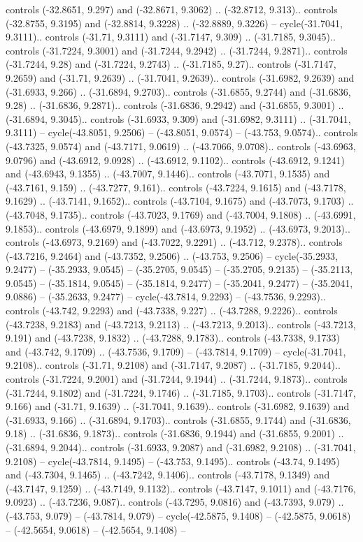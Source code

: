 \begin{scope}[shift={(2.5552, 9.9912)}]
\begin{scope}[shift={(48.1654, -14.8546)}]
controls (-32.8651, 9.297) and (-32.8671, 9.3062) .. (-32.8712, 9.313).. controls (-32.8755, 9.3195) and (-32.8814, 9.3228) .. (-32.8889, 9.3226) -- cycle(-31.7041, 9.3111).. controls (-31.71, 9.3111) and (-31.7147, 9.309) .. (-31.7185, 9.3045).. controls (-31.7224, 9.3001) and (-31.7244, 9.2942) .. (-31.7244, 9.2871).. controls (-31.7244, 9.28) and (-31.7224, 9.2743) .. (-31.7185, 9.27).. controls (-31.7147, 9.2659) and (-31.71, 9.2639) .. (-31.7041, 9.2639).. controls (-31.6982, 9.2639) and (-31.6933, 9.266) .. (-31.6894, 9.2703).. controls (-31.6855, 9.2744) and (-31.6836, 9.28) .. (-31.6836, 9.2871).. controls (-31.6836, 9.2942) and (-31.6855, 9.3001) .. (-31.6894, 9.3045).. controls (-31.6933, 9.309) and (-31.6982, 9.3111) .. (-31.7041, 9.3111) -- cycle(-43.8051, 9.2506) -- (-43.8051, 9.0574) -- (-43.753, 9.0574).. controls (-43.7325, 9.0574) and (-43.7171, 9.0619) .. (-43.7066, 9.0708).. controls (-43.6963, 9.0796) and (-43.6912, 9.0928) .. (-43.6912, 9.1102).. controls (-43.6912, 9.1241) and (-43.6943, 9.1355) .. (-43.7007, 9.1446).. controls (-43.7071, 9.1535) and (-43.7161, 9.159) .. (-43.7277, 9.161).. controls (-43.7224, 9.1615) and (-43.7178, 9.1629) .. (-43.7141, 9.1652).. controls (-43.7104, 9.1675) and (-43.7073, 9.1703) .. (-43.7048, 9.1735).. controls (-43.7023, 9.1769) and (-43.7004, 9.1808) .. (-43.6991, 9.1853).. controls (-43.6979, 9.1899) and (-43.6973, 9.1952) .. (-43.6973, 9.2013).. controls (-43.6973, 9.2169) and (-43.7022, 9.2291) .. (-43.712, 9.2378).. controls (-43.7216, 9.2464) and (-43.7352, 9.2506) .. (-43.753, 9.2506) -- cycle(-35.2933, 9.2477) -- (-35.2933, 9.0545) -- (-35.2705, 9.0545) -- (-35.2705, 9.2135) -- (-35.2113, 9.0545) -- (-35.1814, 9.0545) -- (-35.1814, 9.2477) -- (-35.2041, 9.2477) -- (-35.2041, 9.0886) -- (-35.2633, 9.2477) -- cycle(-43.7814, 9.2293) -- (-43.7536, 9.2293).. controls (-43.742, 9.2293) and (-43.7338, 9.227) .. (-43.7288, 9.2226).. controls (-43.7238, 9.2183) and (-43.7213, 9.2113) .. (-43.7213, 9.2013).. controls (-43.7213, 9.191) and (-43.7238, 9.1832) .. (-43.7288, 9.1783).. controls (-43.7338, 9.1733) and (-43.742, 9.1709) .. (-43.7536, 9.1709) -- (-43.7814, 9.1709) -- cycle(-31.7041, 9.2108).. controls (-31.71, 9.2108) and (-31.7147, 9.2087) .. (-31.7185, 9.2044).. controls (-31.7224, 9.2001) and (-31.7244, 9.1944) .. (-31.7244, 9.1873).. controls (-31.7244, 9.1802) and (-31.7224, 9.1746) .. (-31.7185, 9.1703).. controls (-31.7147, 9.166) and (-31.71, 9.1639) .. (-31.7041, 9.1639).. controls (-31.6982, 9.1639) and (-31.6933, 9.166) .. (-31.6894, 9.1703).. controls (-31.6855, 9.1744) and (-31.6836, 9.18) .. (-31.6836, 9.1873).. controls (-31.6836, 9.1944) and (-31.6855, 9.2001) .. (-31.6894, 9.2044).. controls (-31.6933, 9.2087) and (-31.6982, 9.2108) .. (-31.7041, 9.2108) -- cycle(-43.7814, 9.1495) -- (-43.753, 9.1495).. controls (-43.74, 9.1495) and (-43.7304, 9.1465) .. (-43.7242, 9.1406).. controls (-43.7178, 9.1349) and (-43.7147, 9.1259) .. (-43.7149, 9.1132).. controls (-43.7147, 9.1011) and (-43.7176, 9.0923) .. (-43.7236, 9.087).. controls (-43.7295, 9.0816) and (-43.7393, 9.079) .. (-43.753, 9.079) -- (-43.7814, 9.079) -- cycle(-42.5875, 9.1408) -- (-42.5875, 9.0618) -- (-42.5654, 9.0618) -- (-42.5654, 9.1408) -- 
\end{scope}
\end{scope}
